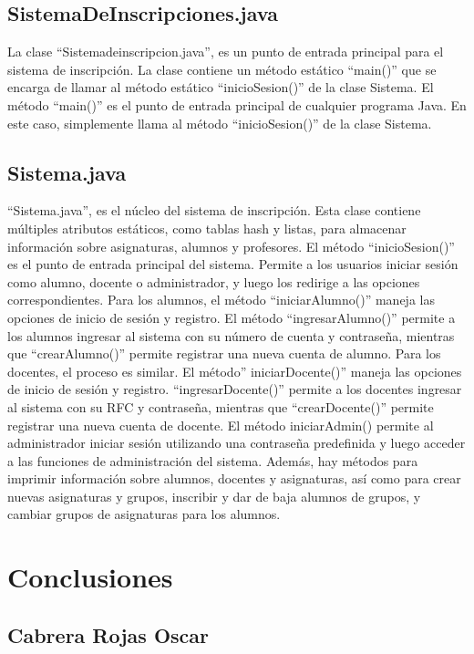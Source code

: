 \documentclass[a4paper,12pt]{article}
\begin{document}
\subsection{SistemaDeInscripciones.java}
La clase “Sistemadeinscripcion.java”, es un punto de entrada principal para el sistema de 
inscripción. La clase contiene un método estático “main()” que se encarga de llamar al 
método estático “inicioSesion()” de la clase Sistema.
El método “main()” es el punto de entrada principal de cualquier programa Java. En este caso, 
simplemente llama al método “inicioSesion()” de la clase Sistema.

\subsection{Sistema.java}
“Sistema.java”, es el núcleo del sistema de inscripción. Esta clase contiene múltiples 
atributos estáticos, como tablas hash y listas, para almacenar información sobre 
asignaturas, alumnos y profesores.
El método “inicioSesion()” es el punto de entrada principal del sistema. Permite a los 
usuarios iniciar sesión como alumno, docente o administrador, y luego los redirige a las 
opciones correspondientes.
Para los alumnos, el método “iniciarAlumno()” maneja las opciones de inicio de sesión y 
registro. El método “ingresarAlumno()” permite a los alumnos ingresar al sistema con su 
número de cuenta y contraseña, mientras que “crearAlumno()” permite registrar una nueva 
cuenta de alumno.
Para los docentes, el proceso es similar. El método” iniciarDocente()” maneja las opciones de 
inicio de sesión y registro. “ingresarDocente()” permite a los docentes ingresar al sistema con 
su RFC y contraseña, mientras que “crearDocente()” permite registrar una nueva cuenta de 
docente.
El método iniciarAdmin() permite al administrador iniciar sesión utilizando una contraseña 
predefinida y luego acceder a las funciones de administración del sistema.
Además, hay métodos para imprimir información sobre alumnos, docentes y asignaturas, así 
como para crear nuevas asignaturas y grupos, inscribir y dar de baja alumnos de grupos, y 
cambiar grupos de asignaturas para los alumnos.

\section{Conclusiones}

\subsection{Cabrera Rojas Oscar}
\end{document}
